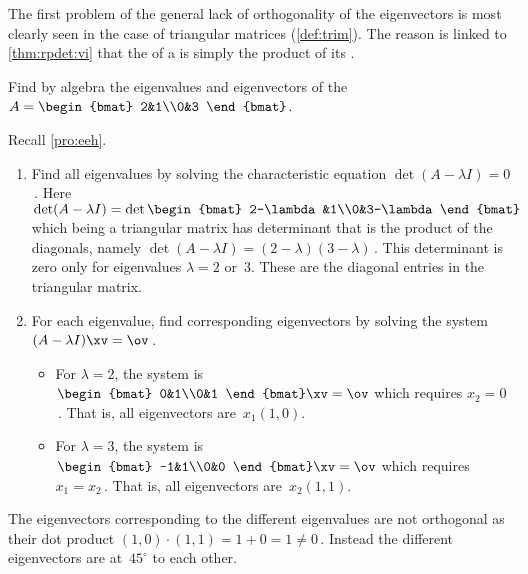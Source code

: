 The first problem of the general lack of orthogonality of the eigenvectors is most clearly seen in the case of triangular matrices (\cref{def:trim}).
The reason is  linked to \cref{thm:rpdet:vi} that the  of a  is simply the product of its .

\begin{example} 
Find by algebra the eigenvalues and eigenvectors of the  \(A=\begin{bmat} 2&1\\0&3 \end{bmat}\).
\begin{solution} 
Recall \cref{pro:eeh}. 
\begin{enumerate}
\item Find all eigenvalues by solving the characteristic equation \(\det(A-\lambda I)=0\)\,. 
Here \(\det(A-\lambda I)=\det\begin{bmat} 2-\lambda&1\\0&3-\lambda \end{bmat}\) which being a triangular matrix has determinant that is the product of the diagonals, namely \(\det(A-\lambda I)=(2-\lambda)(3-\lambda)\)\,.
This determinant is zero only for eigenvalues \(\lambda=2\) or~\(3\).
These are the diagonal entries in the triangular matrix.
\item For each eigenvalue, find corresponding eigenvectors by solving the system \((A-\lambda I)\xv=\ov\)\,.
\begin{itemize}
\item For \(\lambda=2\), the system is \(\begin{bmat} 0&1\\0&1 \end{bmat}\xv=\ov\) which requires \(x_2=0\)\,.  That is, all eigenvectors are~\(x_1(1,0)\).
\item For \(\lambda=3\), the system is \(\begin{bmat} -1&1\\0&0 \end{bmat}\xv=\ov\) which requires \(x_1=x_2\)\,.  That is, all eigenvectors are~\(x_2(1,1)\).
\end{itemize}
\end{enumerate}
The eigenvectors corresponding to the different eigenvalues are not orthogonal as their dot product \((1,0)\cdot(1,1)=1+0=1\neq 0\)\,. 
Instead the different eigenvectors are at~\(45^\circ\) to each other.
\end{solution}
\end{example}



